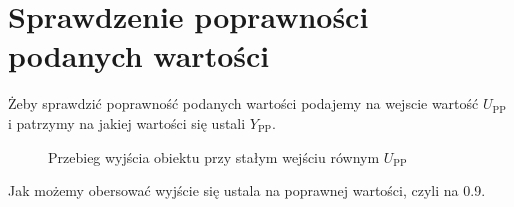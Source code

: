 \chapter{Sprawdzenie poprawności podanych wartości}
Żeby sprawdzić poprawność podanych wartości podajemy na wejscie wartość $U_{\mathrm{PP}}$ i patrzymy na jakiej wartości się ustali $Y_{\mathrm{PP}}$.

\begin{figure}[H]
\centering

\caption{Przebieg wyjścia obiektu przy stałym wejściu równym $U_{\mathrm{PP}}$}
\end{figure}

Jak możemy obersować wyjście się ustala na poprawnej wartości, czyli na \num{0.9}.
